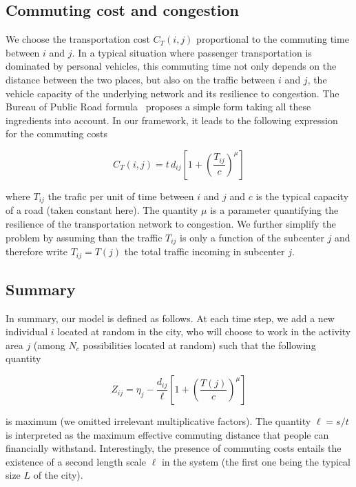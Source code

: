 \subsection{Commuting cost and congestion}
\label{sub:the_commuting_cost}


We choose the transportation cost $C_T(i,j)$ 
proportional to the commuting time between $i$ and $j$. In a typical
situation where passenger transportation is dominated by personal
vehicles, this commuting time not only depends on the distance between
the two places, but also on the traffic between $i$ and $j$, the vehicle capacity of
the underlying network and its resilience to congestion. The Bureau of
Public Road formula~\cite{Branston:1976} proposes a simple form taking
all these ingredients into account. In our framework, it leads to the following expression for the 
commuting costs

\begin{equation}
    C_T(i,j) =  t\, d_{ij} \left[ 1 + \left( \frac{T_{ij}}{c} \right)^{\mu} \right]
    \label{eq:commuting_cost}
\end{equation}

where $T_{ij}$ the trafic per unit of time between $i$ and $j$ and $c$
is the typical capacity of a road (taken constant here). The quantity
$\mu$ is a parameter quantifying the resilience of the transportation
network to congestion. We further simplify the problem by assuming
than the traffic $T_{ij}$ is only a function of the subcenter $j$ and
therefore write $T_{ij}=T(j)$ the total traffic incoming in subcenter
$j$.

\subsection{Summary}
\label{sub:summary}


In summary, our model is defined as follows. At each time step, we add
a new individual $i$ located at random in the city, who will
choose to work in the activity area $j$ (among $N_c$ possibilities
located at random) such that the following quantity

\begin{equation}
    Z_{ij} = \eta_j - \frac{d_{ij}}{\ell} \left[ 1 + \left( \frac{T(j)}{c} \right)^{\mu} \right]
    \label{eq:cost_function}
\end{equation}

is maximum (we omitted irrelevant multiplicative factors). The quantity $\ell =
s/t$ is interpreted as the maximum effective commuting distance that people can
financially withstand. Interestingly, the presence of commuting costs entails the
existence of a second length scale $\ell$ in the system (the first one being the
typical size $L$ of the city).

